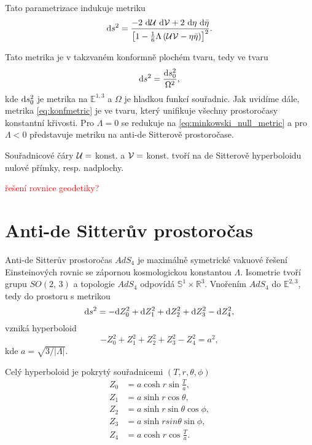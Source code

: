 Tato parametrizace indukuje metriku
\begin{equation}
     \label{eq:konfmetric}
     \mathrm{d} s^2 = \frac{-2 ~ \mathrm{d} \mathcal{U} ~ \mathrm{d} \mathcal{V} + 2 ~ \mathrm{d} \eta ~ \mathrm{d} \bar{\eta}}{\left[1-\tfrac{1}{6} \Lambda \left(\mathcal{U} \mathcal{V} - \eta \bar{\eta}\right)\right]^2}.
\end{equation}

Tato metrika je v takzvaném konformně plochém tvaru, tedy ve tvaru
\begin{equation}
     \mathrm{d} s^2 = \frac{\mathrm{d} s_0^2}{\Omega^2},
\end{equation}
kde $\mathrm{d} s_0^2$ je metrika na $\mathbb{E}^{1,3}$ a $\Omega$ je hladkou funkcí souřadnic. Jak uvidíme dále,
metrika \eqref{eq:konfmetric} je ve tvaru, který unifikuje všechny prostoročasy konstantní křivosti.
Pro $\Lambda = 0$ se redukuje na \eqref{eq:minkowski_null_metric} a pro $\Lambda < 0$ představuje metriku na
anti-de Sitterově prostoročase.

Souřadnicové čáry $\mathcal{U} =$ konst. a $\mathcal{V} =$ konst. tvoří na de Sitterově hyperboloidu nulové
přímky, resp. nadplochy.

\textcolor{red}{řešení rovnice geodetiky?}

\section{Anti-de Sitterův prostoročas}

Anti-de Sitterův prostoročas $AdS_4$ je maximálně symetrické vakuové řešení Einsteinových rovnic se zápornou
kosmologickou konstantou $\Lambda$. Isometrie tvoří grupu $SO(2,\,3)$ a topologie $AdS_4$ odpovídá $\mathbb{S}^1 \times \mathbb{R}^3$.
Vnořením $AdS_4$ do $\mathbb{E}^{2,3}$, tedy do prostoru s metrikou
\begin{equation}
     \label{eq:AdS5DMetric}
     \mathrm{d} s^2 = -\mathrm{d} Z_0^2 + \mathrm{d} Z_1^2 + \mathrm{d} Z_2^2 + \mathrm{d} Z_3^2 - \mathrm{d} Z_4^2,
\end{equation}
vzniká hyperboloid
\begin{equation}
     \label{eq:AdS_hyperboloid}
     -Z_0^2 + Z_1^2 + Z_2^2 + Z_3^2 - Z_4^2 = a^2,
\end{equation}
kde $a = \sqrt{3/|\Lambda|}$.

Celý hyperboloid je pokrytý souřadnicemi $(T, r, \theta, \phi)$
\begin{equation}
     \begin{split}
          Z_0 &= a \cosh r \sin \frac{T}{a}, \\
          Z_1 &= a \sinh r \cos \theta, \\
          Z_2 &= a \sinh r \sin \theta \cos \phi, \\
          Z_3 &= a \sinh r sin \theta \sin \phi, \\
          Z_4 &= a \cosh r \cos \frac{T}{a}.
     \end{split}
\end{equation}

